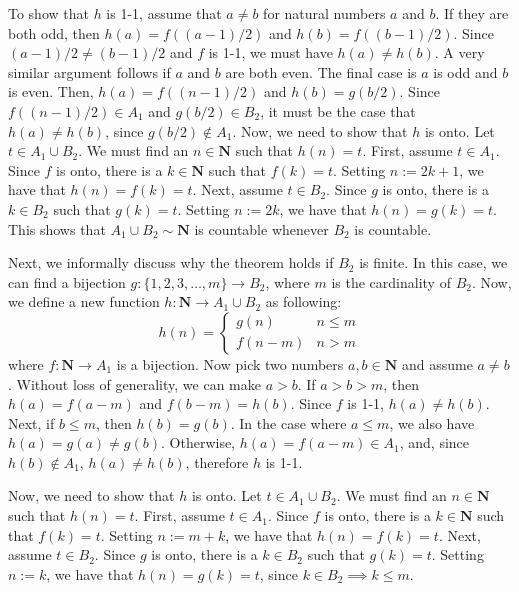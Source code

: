 \documentclass{article}
\newcommand{\N}{\mathbf{N}}
\begin{document}
\begin{enumerate}
\begin{enumerate}
		      To show that $h$ is 1-1, assume that $a \neq b$ for natural numbers $a$ and $b$. If they are both odd, then $h(a) = f((a-1)/2)$ and $h(b) = f((b-1)/2)$. Since $(a-1)/2 \neq (b-1)/2$ and $f$ is 1-1, we must have $h(a) \neq h(b)$.
		      A very similar argument follows if $a$ and $b$ are both even. The final case is $a$ is odd and $b$ is even. Then, $h(a) = f((n-1)/2)$ and $h(b) = g(b/2)$. Since $f((n-1)/2) \in A_1$ and $g(b/2) \in B_2$, it must be the case that $h(a) \neq h(b)$, since $g(b/2) \notin A_1$. Now, we need to show that $h$ is onto. Let $t \in A_1 \cup B_2$. We must find an $n \in \N$ such that $h(n) = t$. First, assume $t \in A_1$. Since $f$ is onto, there is a $k \in \N$ such that $f(k) = t$. Setting $n := 2k + 1$, we have that $h(n)=f(k)=t$. Next, assume $t \in B_2$. Since $g$ is onto, there is a $k \in B_2$ such that $g(k) = t$. Setting $n := 2k$, we have that $h(n)=g(k)=t$.
		      This shows that $A_1 \cup B_2 \sim \N$ is countable whenever $B_2$ is countable.
		      		      		      	      	      	      	        
		      Next, we informally discuss why the theorem holds if $B_2$ is finite. In this case, we can find a bijection $g: \{1, 2, 3, \dots, m\} \rightarrow B_2$, where $m$ is the cardinality of $B_2$. Now, we define a new function $h: \N \rightarrow A_1 \cup B_2$ as following: 
		      \begin{equation*}
		      	h(n) = \begin{cases}
		      	g(n) & n \leq m \\
		      	f(n-m) & n > m
		      	\end{cases}
		      \end{equation*}
		      where $f : \N \rightarrow A_1$ is a bijection. Now pick two numbers $a, b \in \N$ and assume $a \neq b$. Without loss of generality, we can make $a > b$. If $a > b > m$, then $h(a) = f(a-m)$ and $f(b-m) = h(b)$. Since $f$ is 1-1, $h(a) \neq h(b)$. Next, if $b \leq m$,  then $h(b) = g(b)$. In the case where $a \leq m$, we also have $h(a) = g(a) \neq g(b)$. Otherwise, $h(a) = f(a-m) \in A_1$, and, since $h(b) \notin A_1$, $h(a) \neq h(b)$, therefore $h$ is 1-1.
		      		      		      	      	      	      	        
		      Now, we need to show that $h$ is onto. Let $t \in A_1 \cup B_2$. We must find an $n \in \N$ such that $h(n) = t$. First, assume $t \in A_1$. Since $f$ is onto, there is a $k \in \N$ such that $f(k) = t$. Setting $n := m + k$, we have that $h(n) = f(k) = t$. Next, assume $t \in B_2$. Since $g$ is onto, there is a $k \in B_2$ such that $g(k) = t$. Setting $n := k$, we have that $h(n)=g(k)=t$, since $k \in B_2 \implies k \leq m$.
		      		      		      	      	      	      	        

\end{enumerate}
\end{enumerate}
\end{document}
